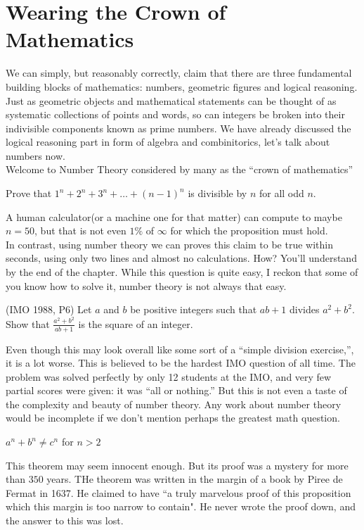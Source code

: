 \chapter{Wearing the Crown of Mathematics}
We can simply, but reasonably correctly, claim that there are three fundamental building blocks of mathematics: numbers, geometric figures and logical reasoning. Just as geometric objects and mathematical statements can be thought of as systematic collections of points and words, so can integers be broken into their indivisible components known as prime numbers. We have already discussed the logical reasoning part in form of algebra and combinitorics, let's talk about numbers now.\\
Welcome to Number Theory considered by many as the “crown of mathematics”\\
\begin{example}
    Prove that $1^n+2^n+3^n+\dots+(n-1)^n$ is divisible by $n$ for all odd $n$.
\end{example}
A human calculator(or a machine one for that matter) can compute to maybe $n=50$, but that is not even $1\%$ of $\infty$ for which the proposition must hold.\\
In contrast, using number theory we can proves this claim to be true within seconds, using only two lines and almost no calculations. How? You'll understand by the end of the chapter. While this question is quite easy, I reckon that some of you know how to solve it, number theory is not always that easy.\\
\begin{example}
    (IMO 1988, P6) Let $a$ and $b$ be positive integers such that $ab + 1$ divides $a^{2} + b^{2}$. Show that $\frac {a^{2} + b^{2}}{ab + 1}$ is the square of an integer.
\end{example}
Even though this may look overall like some sort of a “simple division exercise,”, it is a lot worse. This is believed to be the hardest IMO question of all time. The problem was solved perfectly by only 12 students at the IMO, and very few partial scores were given: it was “all or nothing.” But this is not even a taste of the complexity and beauty of number theory. Any work about number theory would be incomplete if we don't mention perhaps the greatest math question.\\
\begin{theorem}
    $a^n+b^n \neq c^n$ for $n>2$
\end{theorem}    
This theorem may seem innocent enough. But its proof was a mystery for more than $350$ years. THe theorem was written in the margin of a book by Piree de Fermat in 1637. He claimed to have “a truly marvelous proof of this proposition which this margin is too narrow to contain". He never wrote the proof down, and the answer to this was lost.\\
